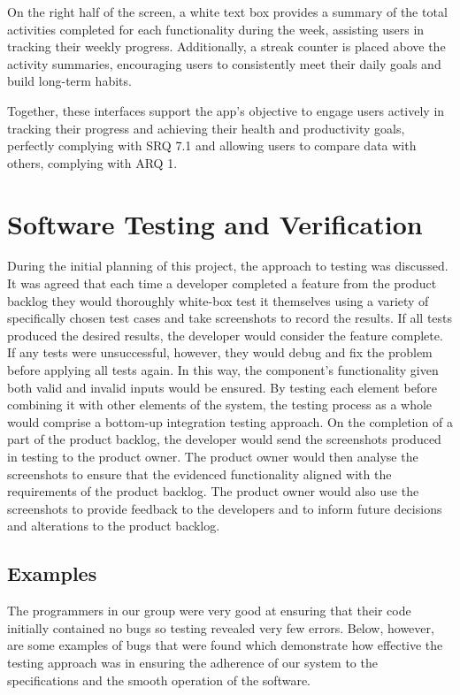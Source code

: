 \documentclass[12pt]{article}
\begin{document}
On the right half of the screen, a white text box provides a summary of the total activities
completed for each functionality during the week, assisting users in tracking their weekly
progress. Additionally, a streak counter is placed above the activity summaries, encouraging
users to consistently meet their daily goals and build long-term habits.\par

Together, these interfaces support the app’s objective to engage users actively in tracking
their progress and achieving their health and productivity goals, perfectly complying with SRQ 7.1 and allowing users to compare data with others, complying with ARQ 1.\par


\section{Software Testing and Verification} \label{sec:testing}

During the initial planning of this project, the approach to testing was
discussed. It was agreed that each time a developer completed a feature from the
product backlog they would thoroughly white-box test it themselves using a
variety of specifically chosen test cases and take screenshots to record the
results. If all tests produced the desired results, the developer would consider
the feature complete. If any tests were unsuccessful, however, they would debug
and fix the problem before applying all tests again. In this way, the component's
functionality given both valid and invalid inputs would be ensured. By testing
each element before combining it with other elements of the system, the testing
process as a whole would comprise a bottom-up integration testing approach. On
the completion of a part of the product backlog, the developer would send the
screenshots produced in testing to the product owner. The product owner would
then analyse the screenshots to ensure that the evidenced functionality aligned
with the requirements of the product backlog. The product owner would also use
the screenshots to provide feedback to the developers and to inform future
decisions and alterations to the product backlog.\par

\subsection{Examples}

The programmers in our group were very good at ensuring that their code
initially contained no bugs so testing revealed very few errors. Below,
however, are some examples of bugs that were found which demonstrate how
effective the testing approach was in ensuring the adherence of our system to
the specifications and the smooth operation of the software.\par
\end{document}
